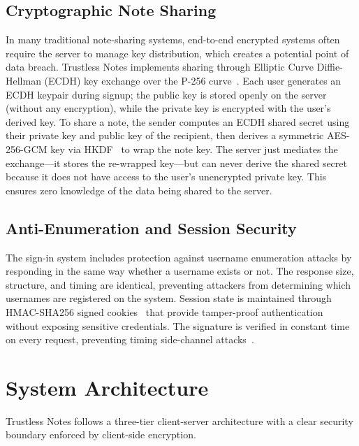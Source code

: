 \documentclass[conference]{IEEEtran}
\begin{document}
\subsection{Cryptographic Note Sharing}

In many traditional note-sharing systems, end-to-end encrypted systems often require the server to manage key distribution, which creates a potential point of data breach. Trustless Notes implements sharing through Elliptic Curve Diffie-Hellman (ECDH) key exchange over the P-256 curve~\cite{ref7,ref19}. Each user generates an ECDH keypair during signup; the public key is stored openly on the server (without any encryption), while the private key is encrypted with the user's derived key. To share a note, the sender computes an ECDH shared secret using their private key and public key of the recipient, then derives a symmetric AES-256-GCM key via HKDF~\cite{ref4} to wrap the note key. The server just mediates the exchange---it stores the re-wrapped key---but can never derive the shared secret because it does not have access to the user's unencrypted private key. This ensures zero knowledge of the data being shared to the server.

\subsection{Anti-Enumeration and Session Security}

The sign-in system includes protection against username enumeration attacks by responding in the same way whether a username exists or not. The response size, structure, and timing are identical, preventing attackers from determining which usernames are registered on the system. Session state is maintained through HMAC-SHA256 signed cookies~\cite{ref10,ref11} that provide tamper-proof authentication without exposing sensitive credentials. The signature is verified in constant time on every request, preventing timing side-channel attacks~\cite{ref15}.

\section{System Architecture}

Trustless Notes follows a three-tier client-server architecture with a clear security boundary enforced by client-side encryption.
\end{document}
